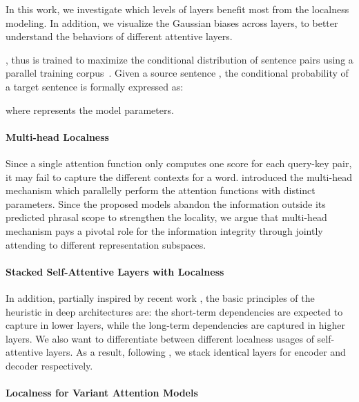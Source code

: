 \documentclass[11pt,a4paper]{article}
\begin{document}
In this work, we investigate which levels of layers benefit most from the localness modeling. In addition, we visualize the Gaussian biases across layers, to better understand the behaviors of different attentive layers.



\iffalse
, thus is trained to maximize the conditional distribution of sentence pairs using {a} parallel training corpus~\cite{kalchbrenner2013recurrent,sutskever2014sequence,cho2014learning,cho2014properties}. Given a source sentence  , the conditional probability of a target sentence   is formally expressed as:
  
 where  represents the model parameters. 

 








\paragraph{Multi-head Localness}  Since a single attention function only computes one score for each query-key pair, it may fail to capture the different contexts for a word.  introduced the multi-head mechanism which parallelly perform the attention functions with distinct parameters. Since the proposed models abandon the information outside its predicted phrasal scope to strengthen the locality, we argue that multi-head mechanism pays a pivotal role for the information integrity through jointly attending to different representation subspaces.  

\paragraph{Stacked Self-Attentive Layers with Localness}
In addition, partially inspired by recent work \cite{shi2016does,yang2017towards,Peters:2018:NAACL}, the basic principles of the heuristic in deep architectures are: the short-term dependencies are expected to capture in lower layers, while the long-term dependencies are captured in higher layers. We also want to differentiate between different localness usages of self-attentive layers.
As a result, following , we stack  identical layers for encoder and decoder respectively.
\paragraph{Localness for Variant Attention Models}
\end{document}
